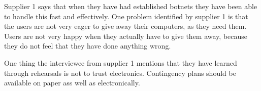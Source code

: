 Supplier 1 says that when they have had established botnets they have been able to handle this fast and effectively. One problem identified by supplier 1 is that the users are not very eager to give away their computers, as they need them. Users are not very happy when they actually have to give them away, because they do not feel that they have done anything wrong.

One thing the interviewee from supplier 1 mentions that they have learned through rehearsals is not to trust electronics. Contingency plans should be available on paper ass well as electronically.